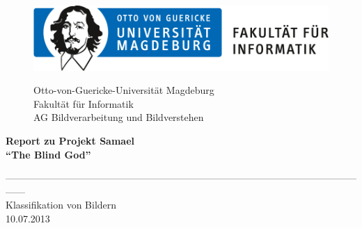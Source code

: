 \documentclass[liststotoc,11pt,a4paper]{article}
\begin{document}
\begin{figure}[htbp]
\begin{minipage}[t]{5cm}
\vspace{0pt}
\includegraphics{ovgu_logo_fak_inf}
\end{minipage}
\hfill
\begin{minipage}[t]{8cm}
\vspace{0pt}
\begin{flushright}     
Otto-von-Guericke-Universität Magdeburg\\Fakultät für Informatik\\AG Bildverarbeitung und Bildverstehen\\
\end{flushright}
\end{minipage}
\end{figure}
\vspace{50pt}

\begin{center}
\huge\bfseries Report zu Projekt Samael\\
\vspace{10pt}
\large"`The Blind God"'\\
\end{center}
\begin{center}
\vspace{20pt}
------------------------------------------------------------------------------------------------------------------\\[30pt]
\large Klassifikation von Bildern\\
\vspace{10pt}
\normalsize 10.07.2013 \\[220pt] 
\end {center}
\end{document}
